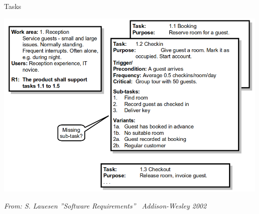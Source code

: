 \begin{Slide}{Tasks}
\begin{minipage}[t]{0.87\textwidth}
\vspace{-0.4em}\includegraphics[width=1.0\textwidth]{../img/tasks-hotel}
\vspace{-0.5em}
\end{minipage}

{\fontsize{5}{5}\itshape\selectfont From: S. Lauesen ''Software Requirements'' \textcopyright~Addison-Wesley 2002}

\end{Slide}
